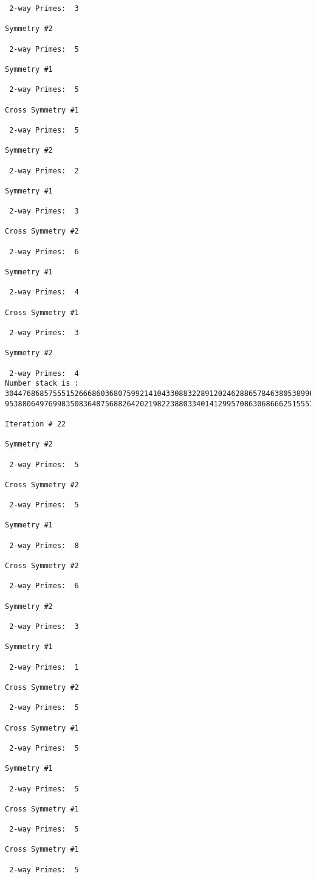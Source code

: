{{{{\begin{verbatim}
 2-way Primes: 	3

Symmetry #2

 2-way Primes: 	5

Symmetry #1

 2-way Primes: 	5

Cross Symmetry #1

 2-way Primes: 	5

Symmetry #2

 2-way Primes: 	2

Symmetry #1

 2-way Primes: 	3

Cross Symmetry #2

 2-way Primes: 	6

Symmetry #1

 2-way Primes: 	4

Cross Symmetry #1

 2-way Primes: 	3

Symmetry #2

 2-way Primes: 	4
Number stack is :
30447686857555152666860368075992141043308832289120246288657846380538996794608835958544046240163340857
95388064976998350836487568826420219822388033401412995708630686662515557586867440375804336104264044585

Iteration #	22

Symmetry #2

 2-way Primes: 	5

Cross Symmetry #2

 2-way Primes: 	5

Symmetry #1

 2-way Primes: 	8

Cross Symmetry #2

 2-way Primes: 	6

Symmetry #2

 2-way Primes: 	3

Symmetry #1

 2-way Primes: 	1

Cross Symmetry #2

 2-way Primes: 	5

Cross Symmetry #1

 2-way Primes: 	5

Symmetry #1

 2-way Primes: 	5

Cross Symmetry #1

 2-way Primes: 	5

Cross Symmetry #1

 2-way Primes: 	5


\end{verbatim}}}}}
